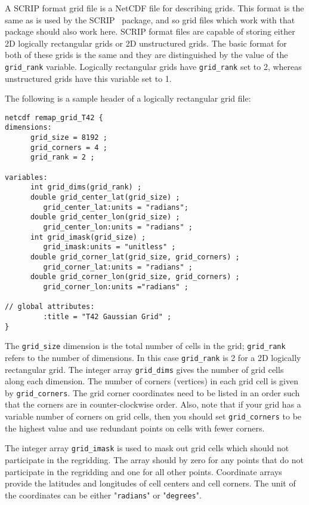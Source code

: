 A SCRIP format grid file is a NetCDF file for describing grids. This format is the same as is used by the SCRIP~\cite{ref:SCRIP}
package, and so grid files which work with that package should also work here.  SCRIP format files are capable of storing either 2D logically rectangular
grids or 2D unstructured grids. The basic format for both of these grids is the same and they are distinguished by the
value of the {\tt grid\_rank} variable. Logically rectangular grids have {\tt grid\_rank} set to 2,
whereas unstructured grids have this variable set to 1.

The following is a sample header of a logically rectangular grid file:

\begin{verbatim}
netcdf remap_grid_T42 {
dimensions:
      grid_size = 8192 ;
      grid_corners = 4 ;
      grid_rank = 2 ;

variables:
      int grid_dims(grid_rank) ;
      double grid_center_lat(grid_size) ;
         grid_center_lat:units = "radians";
      double grid_center_lon(grid_size) ;
         grid_center_lon:units = "radians" ;
      int grid_imask(grid_size) ;
         grid_imask:units = "unitless" ;
      double grid_corner_lat(grid_size, grid_corners) ;
         grid_corner_lat:units = "radians" ;
      double grid_corner_lon(grid_size, grid_corners) ;
         grid_corner_lon:units ="radians" ;

// global attributes:
         :title = "T42 Gaussian Grid" ;
}
\end{verbatim}

The {\tt grid\_size} dimension is the total number of cells in the grid; {\tt grid\_rank} refers to the
number of dimensions. In this case {\tt grid\_rank} is 2 for a 2D logically rectangular grid.
The integer array {\tt grid\_dims} gives the number of grid cells along each dimension.
The number of corners (vertices) in each grid cell is given by {\tt grid\_corners}.
The grid corner coordinates need to be listed in an order such that the corners are in counter-clockwise
order.  Also, note that if your grid has a variable number of corners on grid cells, then
you should set {\tt grid\_corners} to be the highest value and use redundant points
on cells with fewer corners.

The integer array {\tt grid\_imask} is used to mask out grid cells which should
not participate in the regridding. The array should by zero for any points
that do not participate in the regridding and one for all other points.
Coordinate arrays provide the latitudes and longitudes of cell centers
and cell corners. The unit of the coordinates can be either "{\tt radians}" or "{\tt degrees}".


